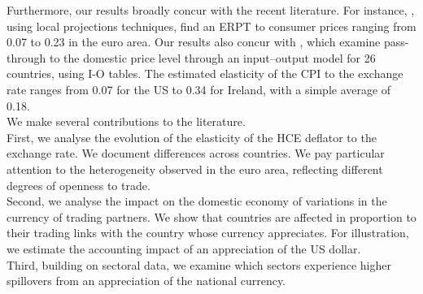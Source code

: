 \documentclass[11pt,a4paper]{paper} %
\begin{document}
Furthermore, our results broadly concur with the recent literature.
For instance, \cite{Colavecchio2020}, using local projections techniques, find an ERPT to consumer prices ranging from 0.07 to 0.23 in the euro area.
Our results also concur with \cite{Aydogus2018}, which examine pass-through to the domestic price level through an input–output model for 26 countries, using I-O tables. 
The estimated elasticity of the CPI to the exchange rate ranges from 0.07 for the US to 0.34 for Ireland, with a simple average of 0.18.\\
We make several contributions to the literature.\\
First, we analyse the evolution of the elasticity of the HCE deflator to the exchange rate. 
We document differences across countries.
We pay particular attention to the heterogeneity observed in the euro area, reflecting different degrees of openness to trade.\\
Second, we analyse the impact on the domestic economy of variations in the currency of trading partners. 
We show that countries are affected in proportion to their trading links with the country whose currency appreciates. 
For illustration, we estimate the accounting impact of an appreciation of the US dollar.\\
Third, building on sectoral data, we examine which sectors experience higher spillovers from an appreciation of the national currency. 
\end{document}
